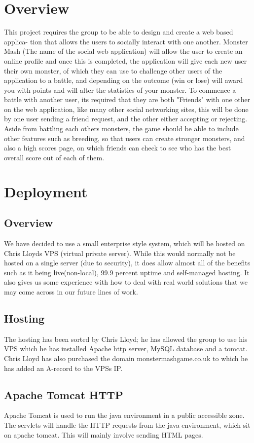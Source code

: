 \documentclass{project}
\begin{document}
\section{Overview}
This project requires the group to be able to design and create a web based applica-
tion that allows the users to socially interact with one another. Monster Mash (The
name of the social web application) will allow the user to create an online profile and
once this is completed, the application will give each new user their own monster,
of which they can use to challenge other users of the application to a battle, and
depending on the outcome (win or lose) will award you with points and will alter
the statistics of your monster.
To commence a battle with another user, its required that they are both "Friends"
with one other on the web application, like many other social networking sites, this
will be done by one user sending a friend request, and the other either accepting or
rejecting.
Aside from battling each others monsters, the game should be able to include other
features such as breeding, so that users can create stronger monsters, and also a
high scores page, on which friends can check to see who has the best overall score
out of each of them.
\section{Deployment}
\subsection{Overview}
We have decided to use a small enterprise style system, which will be hosted on
Chris Lloyds VPS (virtual private server). While this would normally not be hosted
on a single server (due to security), it does allow almost all of the benefits such as it
being live(non-local), 99.9 percent uptime and self-managed hosting. It also gives us some
experience with how to deal with real world solutions that we may come across in
our future lines of work.

\subsection{Hosting}
The hosting has been sorted by Chris Lloyd; he has allowed the group to use his
VPS which he has installed Apache http server, MySQL database and a tomcat.
Chris Lloyd has also purchased the domain monstermashgame.co.uk to which he
has added an A-record to the VPSs IP.

\subsection{Apache Tomcat HTTP}
Apache Tomcat is used to run the java environment in a public accessible zone. The servlets will handle the HTTP requests from the java environment, which sit on apache tomcat. This will mainly involve sending HTML pages.
\end{document}
